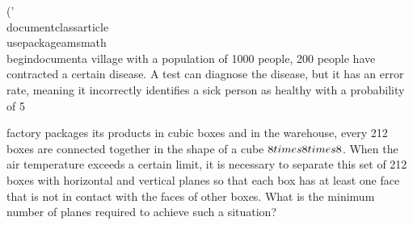 ('\\documentclass{article}\n\\usepackage{amsmath}\n\\begin{document}\n\nIn a village with a population of 1000 people, 200 people have contracted a certain disease. A test can diagnose the disease, but it has an error rate, meaning it incorrectly identifies a sick person as healthy with a probability of 5\\%
\begin{document}
\n\nA factory packages its products in cubic boxes and in the warehouse, every 212 boxes are connected together in the shape of a cube $8 \\times 8 \\times 8$. When the air temperature exceeds a certain limit, it is necessary to separate this set of 212 boxes with horizontal and vertical planes so that each box has at least one face that is not in contact with the faces of other boxes. What is the minimum number of planes required to achieve such a situation?\n\n\
\end{document}

